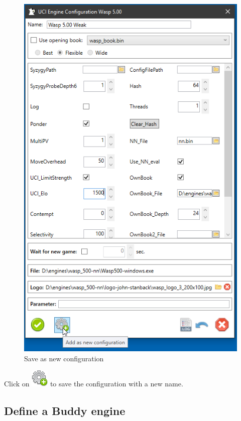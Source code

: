 \documentclass[11pt,a4paper]{article}
\begin{document}
	\begin{figure}[H]
		\centering
		\includegraphics[scale=0.8]{ConfigureWasp_2.png}
		\caption{Save as new configuration}
		\label{fig:LoadEngine3}
	\end{figure}
	Click on \includegraphics[scale=0.5]{cog_add.png} to save the configuration with a new name.\\
	
	
	\subsection{Define a Buddy engine} \label{BuddyEngine}
	
\end{document}
